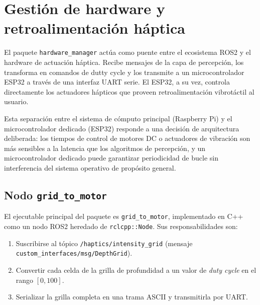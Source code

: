 %
%
%

\section{Gestión de hardware y retroalimentación háptica}
\label{sec:hardware-manager}

El paquete \texttt{hardware\_manager} actúa como puente entre el ecosistema
ROS2 y el hardware de actuación háptica. Recibe mensajes de la capa de
percepción, los transforma en comandos de dutty cycle y los transmite a un
microcontrolador ESP32 a través de una interfaz UART serie. El ESP32, a su
vez, controla directamente los actuadores hápticos que proveen retroalimentación
vibrotáctil al usuario.

Esta separación entre el sistema de cómputo principal (Raspberry Pi) y el
microcontrolador dedicado (ESP32) responde a una decisión de arquitectura
deliberada: los tiempos de control de motores DC o actuadores de vibración
son más sensibles a la latencia que los algoritmos de percepción, y un
microcontrolador dedicado puede garantizar periodicidad de bucle sin
interferencia del sistema operativo de propósito general.

\subsection{Nodo \texttt{grid\_to\_motor}}
\label{sec:hw-grid-to-motor}

El ejecutable principal del paquete es \texttt{grid\_to\_motor}, implementado
en C++ como un nodo ROS2 heredado de \texttt{rclcpp::Node}. Sus
responsabilidades son:

\begin{enumerate}
  \item Suscribirse al tópico \texttt{/haptics/intensity\_grid} (mensaje
        \texttt{custom\_interfaces/msg/DepthGrid}).
  \item Convertir cada celda de la grilla de profundidad a un valor de
        \emph{duty cycle} en el rango $[0, 100]$.
  \item Serializar la grilla completa en una trama ASCII y transmitirla por
        UART.
\end{enumerate}

